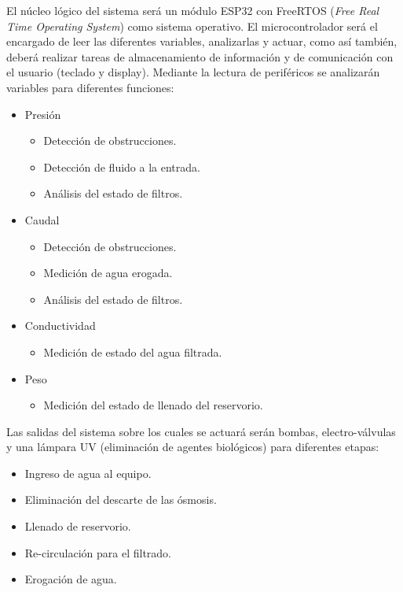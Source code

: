 \documentclass[
11pt, %
]{charter}
\begin{document}
\vspace{25px}

El núcleo lógico del sistema será un módulo ESP32 con FreeRTOS (\textit{Free Real Time Operating System}) como sistema operativo. El microcontrolador será el encargado de leer las diferentes variables, analizarlas y actuar, como así también, deberá realizar tareas de almacenamiento de información y de comunicación con el usuario (teclado y display).
Mediante la lectura de periféricos se analizarán variables para diferentes funciones:
\begin{itemize}
	\item Presión
	\begin{itemize}
		\item Detección de obstrucciones.
		\item Detección de fluido a la entrada.
		\item Análisis del estado de filtros.
	\end{itemize}
	\item Caudal	
	\begin{itemize}
		\item Detección de obstrucciones.
		\item Medición de agua erogada.
		\item Análisis del estado de filtros.
	\end{itemize}
	\item Conductividad
	\begin{itemize}
		\item Medición de estado del agua filtrada.
	\end{itemize}
	\item Peso
	\begin{itemize}
		\item Medición del estado de llenado del reservorio.
	\end{itemize}
\end{itemize}

Las salidas del sistema sobre los cuales se actuará serán bombas, electro-válvulas y una lámpara UV (eliminación de agentes biológicos) para diferentes etapas:
\begin{itemize}
	\item Ingreso de agua al equipo.
	\item Eliminación del descarte de las ósmosis.
	\item Llenado de reservorio.
	\item Re-circulación para el filtrado.
	\item Erogación de agua.
\end{itemize}
\end{document}
